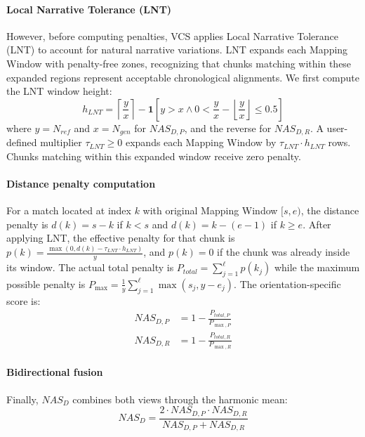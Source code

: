 \documentclass[main.tex]{subfiles}
\begin{document}
\paragraph{Local Narrative Tolerance (LNT)}
However, before computing penalties, VCS applies Local Narrative Tolerance (LNT) to account for natural narrative variations. LNT expands each Mapping Window with penalty-free zones, recognizing that chunks matching within these expanded regions represent acceptable chronological alignments. We first compute the LNT window height:
\begin{equation}
h_{LNT} = \left\lceil \frac{y}{x} \right\rceil - \mathbf{1}[y > x \land 0 < \frac{y}{x} - \left\lfloor \frac{y}{x} \right\rfloor \leq 0.5]
\end{equation}
where $y = N_{ref}$ and $x = N_{gen}$ for $NAS_{D,P}$, and the reverse for $NAS_{D,R}$. A user-defined multiplier $\tau_{LNT} \geq 0$ expands each Mapping Window by $\tau_{LNT} \cdot h_{LNT}$ rows. Chunks matching within this expanded window receive zero penalty.

\paragraph{Distance penalty computation}
For a match located at index $k$ with original Mapping Window $[s, e)$, the distance penalty is $d(k) = s - k$ if $k < s$ and $d(k) = k - (e - 1)$ if $k \geq e$. After applying LNT, the effective penalty for that chunk is $p(k) = \frac{\max(0, d(k) - \tau_{LNT} \cdot h_{LNT})}{y}$, and $p(k) = 0$ if the chunk was already inside its window. The actual total penalty is $P_{total} = \sum_{j=1}^{\ell} p(k_j)$ while the maximum possible penalty is $P_{\max} = \frac{1}{y} \sum_{j=1}^{\ell} \max(s_j, y - e_j)$. The orientation-specific score is:
\begin{align}
NAS_{D,P} &= 1 - \frac{P_{total,P}}{P_{\max,P}} \\
NAS_{D,R} &= 1 - \frac{P_{total,R}}{P_{\max,R}}
\end{align}

\paragraph{Bidirectional fusion}
Finally, $NAS_D$ combines both views through the harmonic mean:
\begin{equation}
NAS_D = \frac{2 \cdot NAS_{D,P} \cdot NAS_{D,R}}{NAS_{D,P} + NAS_{D,R}}
\end{equation}
\end{document}
